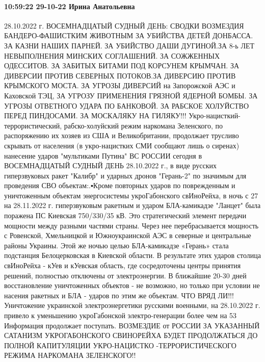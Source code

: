  
 
 
 
 

\paragraph{10:59:22 29-10-22 Ирина Анатольевна}

28.10.2022 г. ВОСЕМНАДЦАТЫЙ СУДНЫЙ ДЕНЬ: СВОДКИ ВОЗМЕЗДИЯ БАНДЕРО-ФАШИСТКИМ
ЖИВОТНЫМ ЗА УБИЙСТВА ДЕТЕЙ ДОНБАССА. ЗА КАЗНИ НАШИХ ПАРНЕЙ. ЗА УБИЙСТВО ДАШИ
ДУГИНОЙ.ЗА 8-ь ЛЕТ НЕВЫПОЛНЕНИЯ МИНСКИХ СОГЛАШЕНИЙ. ЗА СОЖЖЕННЫХ ОДЕССИТОВ. ЗА
ЗАБИТЫХ БИТАМИ ПОД КОРСУНЕМ КРЫМЧАН. ЗА ДИВЕРСИИ ПРОТИВ СЕВЕРНЫХ ПОТОКОВ.ЗА
ДИВЕРСИЮ ПРОТИВ КРЫМСКОГО МОСТА. ЗА УГРОЗЫ ДИВЕРСИЙ на Запорожской АЭС и
Каховской ТЭЦ, ЗА УГРОЗУ ПРИМЕНЕНИЯ ГРЯЗНОЙ ЯДЕРНОЙ БОМБЫ. ЗА УГРОЗЫ ОТВЕТНОГО
УДАРА ПО БАНКОВОЙ. ЗА РАБСКОЕ ХОЛУЙСТВО ПЕРЕД ПИНДОСАМИ. ЗА МОСКАЛЯКУ НА
ГИЛЯКУ!!! Укро-нацисткий-террористический, рабско-холуйский режим наркомана
Зеленского, по распоряжению их хозяев из США и Великобритании, продолжает
трусливо скрывать от населения (в укро-нацистких СМИ сообщают лишь о сиренах)
нанесение ударов "мультиками Путина" ВС РОССИИ сегодня в ВОСЕМНАДЦАТЫЙ СУДНЫЙ
ДЕНЬ 28.10.2022 г., в виде русских гиперзвуковых ракет "Калибр" и ударных
дронов "Герань-2" по значимым для проведения СВО объектам:.▪Кроме повторных
ударов по поврежденным и уничтоженным объектам энергосистемы укроГабонского
свИноРейха, в ночь с 27 на 28.11.2022 г. гиперзвуковым ракетным и ударом
БЛА-камикадзе "Ланцет" была поражена ПС Киевская 750/330/35 кВ. Это
стратегический элемент передачи мощности между разными частями страны. Через
нее перебрасывается мощность с Ровенской, Хмельницкой и Южноукраинской АЭС в
северные и центральные районы Украины. Этой же ночью целью БЛА-камикадзе
«Герань» стала подстанция Белоцерковская в Киевской области. В результате этих
ударов столица свИноРейха - кУев и кУевская область, где сосредоточены центры
принятия решений, полностью отключены от электроэнергии. В ближайшие 20-30 дней
восстановление уничтоженных объектов - не возможно, но только при условии не
насения ракетных и БЛА - ударов по этим же объектам. ЧТО ВРЯД ЛИ!!! Уничтожение
украинской электроэнергетики русскими военными, на 28.10.2022 г. привело к
уменьшению укроГабонской электро-генерации более чем на 53 %
Информация продолжает поступать. ВОЗМЕЗДИЕ от РОССИИ ЗА УКАЗАННЫЙ САТАНИЗМ
УКРОГАБОНСКОГО СВИНОРЕЙХА БУДЕТ ПРОДОЛЖАТЬСЯ ДО ПОЛНОЙ КАПИТУЛЯЦИИ
УКРО-НАЦИСТКО -ТЕРРОРИСТИЧЕСКОГО РЕЖИМА НАРКОМАНА ЗЕЛЕНСКОГО!!

